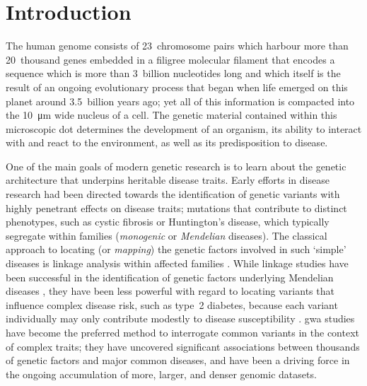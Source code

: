 
\glsresetall



{
\singlespacing
\chapter{Introduction}
\label{ch:introduction}
\minitoc
}


The human genome consists of 23~chromosome pairs which harbour more than 20~thousand genes embedded in a filigree molecular filament that encodes a sequence which is more than 3~billion nucleotides long and which itself is the result of an ongoing evolutionary process that began when life emerged on this planet around 3.5~billion years ago; yet all of this information is compacted into the \SI{10}{\micro\metre} wide nucleus of a cell.
The genetic material contained within this microscopic dot determines the development of an organism, its ability to interact with and react to the environment, as well as its predisposition to disease.

One of the main goals of modern genetic research is to learn about the genetic architecture that underpins heritable disease traits.
Early efforts in disease research had been directed towards the identification of genetic variants with highly penetrant effects on disease traits; \eg mutations that contribute to distinct phenotypes, such as cystic fibrosis or Huntington’s disease, which typically segregate within families (\ie \emph{monogenic} or \emph{Mendelian} diseases).
The classical approach to locating (or \emph{mapping}) the genetic factors involved in such `simple' diseases is linkage analysis within affected families \citep[\eg, see][]{morris2007}.
While linkage studies have been successful in the identification of genetic factors underlying Mendelian diseases \citep{Altshuler:2008kp}, they have been less powerful with regard to locating variants that influence complex disease risk, such as type~2 diabetes, because each variant individually may only contribute modestly to disease susceptibility \citep{Risch:2000jb,Botstein:2003kf}.
\Gls{gwa} studies have become the preferred method to interrogate common variants in the context of complex traits; they have uncovered significant associations between thousands of genetic factors and major common diseases, and have been a driving force in the ongoing accumulation of more, larger, and denser genomic datasets.

